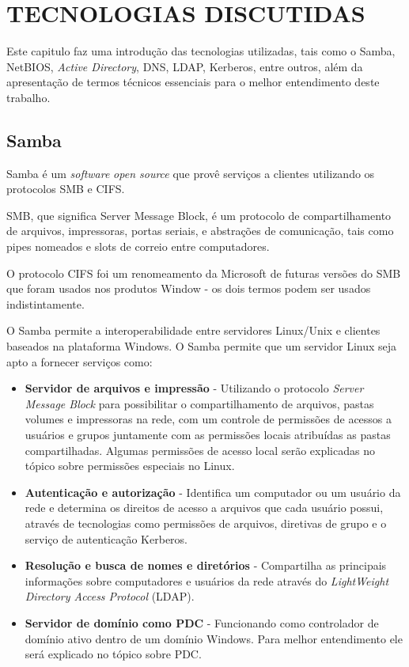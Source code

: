 \chapter{TECNOLOGIAS DISCUTIDAS}

Este capitulo faz uma introdução das tecnologias utilizadas, tais como o Samba, NetBIOS, \textit{Active Directory}, DNS, LDAP, Kerberos, entre outros, além da apresentação de termos técnicos essenciais para o melhor entendimento deste trabalho.

\section{Samba}

Samba é um \textit{software} \textit{open source} que provê serviços a clientes utilizando os protocolos SMB e CIFS.

SMB, que significa Server Message Block, é um protocolo de compartilhamento de arquivos, impressoras, portas seriais, e abstrações de comunicação, tais como pipes nomeados e slots de correio entre computadores.\cite{SMB}

O protocolo CIFS foi um renomeamento da Microsoft de futuras versões do SMB que foram usados nos produtos Window - os dois termos podem ser usados indistintamente. \cite{SAMBA}

O Samba permite a interoperabilidade entre servidores Linux/Unix e clientes baseados na
plataforma Windows.
O Samba permite que um servidor Linux seja apto a fornecer serviços como:
  \begin{itemize}
    \item \textbf{Servidor de arquivos e impressão} - Utilizando o protocolo \textit{Server Message Block} para possibilitar o compartilhamento de arquivos, pastas volumes e impressoras na rede, com um controle de permissões de acessos a usuários e grupos juntamente com as permissões locais atribuídas as pastas compartilhadas. Algumas permissões de acesso local serão explicadas no tópico sobre permissões especiais no Linux.

    \item \textbf{Autenticação e autorização} - Identifica um computador ou um usuário da rede e determina os direitos de acesso a arquivos que cada usuário possui, através de tecnologias como permissões de arquivos, diretivas de grupo e o serviço de autenticação Kerberos.

    \item \textbf{Resolução e busca de nomes e diretórios} - Compartilha as principais informações sobre computadores e usuários da rede através do \textit{LightWeight Directory Access Protocol} (LDAP).%

    \item \textbf{Servidor de domínio como PDC} - Funcionando como controlador de domínio ativo dentro de um domínio Windows. Para melhor entendimento ele será explicado no tópico sobre PDC.
  \end{itemize}

